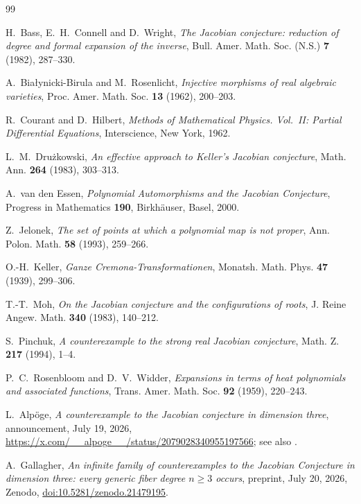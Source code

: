 \documentclass[11pt]{article}
\numberwithin{equation}{section}
\theoremstyle{plain}
\theoremstyle{definition}
\theoremstyle{remark}
\begin{document}
\clearpage
{}
{}
\begin{thebibliography}{99}

H.~Bass, E.~H.~Connell and D.~Wright,
\emph{The Jacobian conjecture: reduction of degree and formal expansion of the
inverse}, Bull. Amer. Math. Soc. (N.S.) \textbf{7} (1982), 287--330.

A.~Bia{\l}ynicki-Birula and M.~Rosenlicht,
\emph{Injective morphisms of real algebraic varieties},
Proc. Amer. Math. Soc. \textbf{13} (1962), 200--203.

R.~Courant and D.~Hilbert,
\emph{Methods of Mathematical Physics. Vol.~II: Partial Differential
Equations}, Interscience, New York, 1962.

L.~M.~Dru\.zkowski,
\emph{An effective approach to Keller's Jacobian conjecture},
Math. Ann. \textbf{264} (1983), 303--313.

A.~van den Essen,
\emph{Polynomial Automorphisms and the Jacobian Conjecture},
Progress in Mathematics \textbf{190}, Birkh\"auser, Basel, 2000.

Z.~Jelonek,
\emph{The set of points at which a polynomial map is not proper},
Ann. Polon. Math. \textbf{58} (1993), 259--266.

O.-H.~Keller,
\emph{Ganze Cremona-Transformationen},
Monatsh. Math. Phys. \textbf{47} (1939), 299--306.

T.-T.~Moh,
\emph{On the Jacobian conjecture and the configurations of roots},
J. Reine Angew. Math. \textbf{340} (1983), 140--212.

S.~Pinchuk,
\emph{A counterexample to the strong real Jacobian conjecture},
Math. Z. \textbf{217} (1994), 1--4.

P.~C.~Rosenbloom and D.~V.~Widder,
\emph{Expansions in terms of heat polynomials and associated functions},
Trans. Amer. Math. Soc. \textbf{92} (1959), 220--243.

L.~Alp\"oge,
\emph{A counterexample to the Jacobian conjecture in dimension three},
announcement, July 19, 2026,
\url{https://x.com/__alpoge__/status/2079028340955197566}; see also
\cite{SBS2026,Tao2026}.

A.~Gallagher,
\emph{An infinite family of counterexamples to the Jacobian Conjecture in
dimension three: every generic fiber degree $n\ge3$ occurs},
preprint, July 20, 2026, Zenodo, \href{https://doi.org/10.5281/zenodo.21479195}{doi:10.5281/zenodo.21479195}.


\end{thebibliography}
\end{document}
